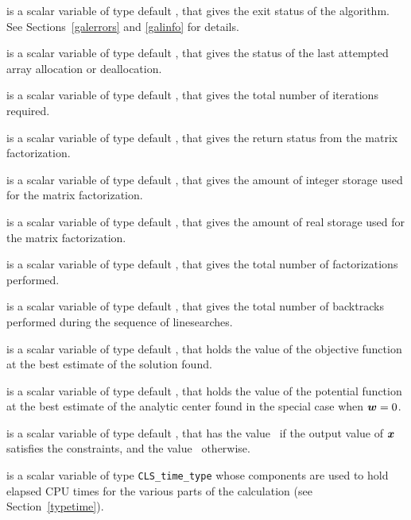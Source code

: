 \documentclass{galahad}
\newcommand{\packagename}{CLS}
\begin{document}
\begin{description}

 is a scalar variable of type default \integer, that gives the
exit status of the algorithm. See Sections~\ref{galerrors} and \ref{galinfo}
for details.

 is a scalar variable of type default \integer, that gives 
the status of the last attempted array allocation or deallocation.

 is a scalar variable of type default \integer, that gives the
total number of iterations required.

 is a scalar variable of type default \integer, that 
gives the return status from the matrix factorization.

 is a scalar variable of type default 
\integer, that gives the amount of integer storage used for the matrix 
factorization.

 is a scalar variable of type default \integer, 
that gives the amount of real storage used for the matrix factorization.

 is a scalar variable of type default \integer, that gives the
total number of factorizations performed.

 is a scalar variable of type default \integer, that gives the
total number of backtracks performed during the sequence of linesearches.

 is a scalar variable of type default \realdp, that holds the
value of the objective function at the best estimate of the solution found.

 is a scalar variable of type default \realdp, that holds the
value of the potential function at the best estimate of the analytic center 
found in the special case when ${\bm{w}} = 0$.

 is a scalar variable of type default \logical, that has the
value \true\ if the output value of ${\bm{x}}$ satisfies the constraints,
and the value \false\ otherwise.

 is a scalar variable of type {\tt \packagename\_time\_type} whose 
components are used to hold elapsed CPU times for the various parts of the 
calculation (see Section~\ref{typetime}).

\end{description}

\end{document}

